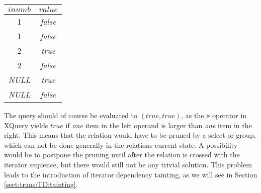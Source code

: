 \begin{figure*}[!h]
\centering
\begin{tabular}{|c|c|} \hline
$inumb$ & $value$ \\\hline
1 & \textit{false} \\\hline
1 & \textit{false} \\\hline
2 & \textit{true} \\\hline
2 & \textit{false} \\\hline
\textit{NULL} & \textit{true} \\\hline
\textit{NULL} & \textit{false} \\\hline
\end{tabular}
\end{figure*}

The query should of course be evaluated to $(true, true)$, as the \texttt{>} operator in XQuery yields $true$ if
\textit{one} item in the left operand is larger than \textit{one} item in the right.
This means that the relation would have to be pruned by a \textsf{select} or \textsf{group}, which can not be done
generally in the relations current state. A possibility would be to postpone the pruning until after the relation
is crossed with the iterator sequence, but there would still not be any trivial
solution. This problem leads to the introduction of iterator dependency
tainting, as we will see in Section \ref{sect:trans:TD:tainting}.
